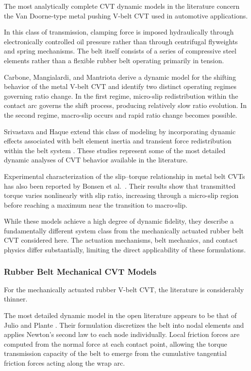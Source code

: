 \documentclass[11pt]{article}
\numberwithin{equation}{section}
\begin{document}
The most analytically complete CVT dynamic models in the literature concern
the Van Doorne-type metal pushing V-belt CVT used in automotive applications.

In this class of transmission, clamping force is imposed hydraulically
through electronically controlled oil pressure rather than through
centrifugal flyweights and spring mechanisms. The belt itself consists
of a series of compressive steel elements rather than a flexible rubber
belt operating primarily in tension.

Carbone, Mangialardi, and Mantriota \cite{Carbone2005} derive a dynamic
model for the shifting behavior of the metal V-belt CVT and identify two
distinct operating regimes governing ratio change. In the first regime,
micro-slip redistribution within the contact arc governs the shift
process, producing relatively slow ratio evolution. In the second regime,
macro-slip occurs and rapid ratio change becomes possible.

Srivastava and Haque extend this class of modeling by incorporating
dynamic effects associated with belt element inertia and transient
force redistribution within the belt system \cite{SrivastavaHaque2006}.
These studies represent some of the most detailed dynamic analyses of
CVT behavior available in the literature.

Experimental characterization of the slip–torque relationship in metal
belt CVTs has also been reported by Bonsen et al.\ \cite{Bonsen2004}.
Their results show that transmitted torque varies nonlinearly with slip
ratio, increasing through a micro-slip region before reaching a maximum
near the transition to macro-slip.

While these models achieve a high degree of dynamic fidelity, they
describe a fundamentally different system class from the mechanically
actuated rubber belt CVT considered here. The actuation mechanisms,
belt mechanics, and contact physics differ substantially, limiting
the direct applicability of these formulations.

\subsubsection{Rubber Belt Mechanical CVT Models}

For the mechanically actuated rubber V-belt CVT, the literature is
considerably thinner.

The most detailed dynamic model in the open literature appears to be
that of Julio and Plante \cite{JulioPlante2011}. Their formulation
discretizes the belt into nodal elements and applies Newton's second
law to each node individually. Local friction forces are computed
from the normal force at each contact point, allowing the torque
transmission capacity of the belt to emerge from the cumulative
tangential friction forces acting along the wrap arc.
\end{document}
